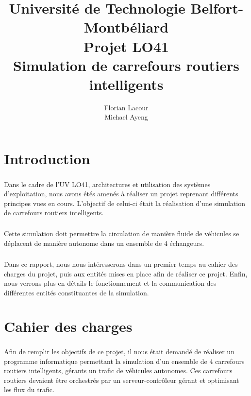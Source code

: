 \documentclass{report}
\title{Université de Technologie Belfort-Montbéliard\\
Projet LO41\\
Simulation de carrefours routiers intelligents}
\author{Florian Lacour\\
Michael Ayeng}
\begin{document}
\maketitle

\tableofcontents



\chapter{Introduction}
	\paragraph{}
		Dans le cadre de l'UV LO41, architectures et utilisation des systèmes d'exploitation, nous avons étés amenés à réaliser un projet reprenant différents principes vues en cours. L'objectif de celui-ci était la réalisation d'une simulation de carrefours routiers intelligents.
	\paragraph{}
		Cette simulation doit permettre la circulation de manière fluide de véhicules se déplacent de manière autonome dans un ensemble de 4 échangeurs.
	\paragraph{}
		Dans ce rapport, nous nous intéresserons dans un premier temps au cahier des charges du projet, puis aux entités mises en place afin de réaliser ce projet. Enfin, nous verrons plus en détails le fonctionnement et la communication des différentes entités constituantes de la simulation.
	
\chapter{Cahier des charges}
	\paragraph{}
	Afin de remplir les objectifs de ce projet, il nous était demandé de réaliser un programme informatique permettant la simulation d'un ensemble de 4 carrefours routiers intelligents, gérants un trafic de véhicules autonomes. Ces carrefours routiers devaient être orchestrés par un serveur-contrôleur gérant et optimisant les flux du trafic.
\end{document}
